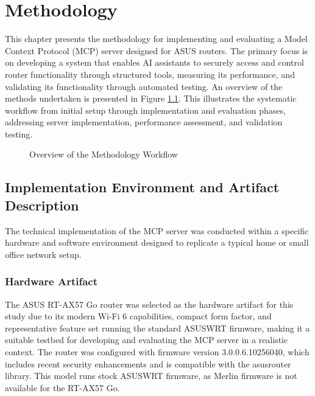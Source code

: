 \chapter{Methodology}
\label{chap:methodology}
This chapter presents the methodology for implementing and evaluating a Model Context Protocol (MCP) server designed for ASUS routers. The primary focus is on developing a system that enables AI assistants to securely access and control router functionality through structured tools, measuring its performance, and validating its functionality through automated testing.
An overview of the methods undertaken is presented in Figure \ref{fig:methodology-overview}. This illustrates the systematic workflow from initial setup through implementation and evaluation phases, addressing server implementation, performance assessment, and validation testing.
\begin{figure}[h]
\centering
\caption{Overview of the Methodology Workflow}
\label{fig:methodology-overview}
\end{figure}
\section{Implementation Environment and Artifact Description}
The technical implementation of the MCP server was conducted within a specific hardware and software environment designed to replicate a typical home or small office network setup.
\subsection{Hardware Artifact}
The ASUS RT-AX57 Go router was selected as the hardware artifact for this study due to its modern Wi-Fi 6 capabilities, compact form factor, and representative feature set running the standard ASUSWRT firmware, making it a suitable testbed for developing and evaluating the MCP server in a realistic context. The router was configured with firmware version 3.0.0.6.10256040, which includes recent security enhancements and is compatible with the asusrouter library. This model runs stock ASUSWRT firmware, as Merlin firmware is not available for the RT-AX57 Go.
